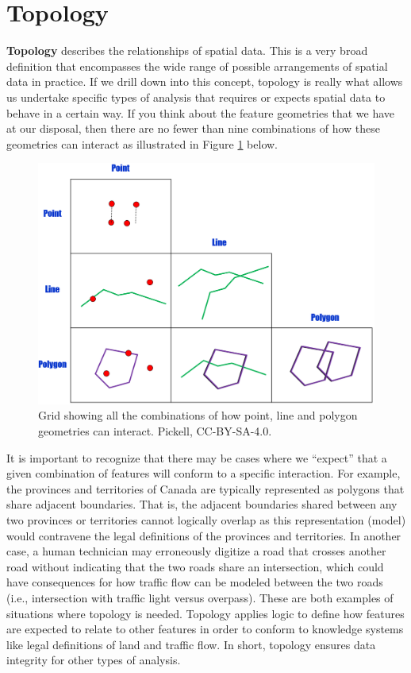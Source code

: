 \documentclass[
]{book}
\begin{document}
\hypertarget{topology}{%
\section{Topology}\label{topology}}

\textbf{Topology} describes the relationships of spatial data. This is a very broad definition that encompasses the wide range of possible arrangements of spatial data in practice. If we drill down into this concept, topology is really what allows us undertake specific types of analysis that requires or expects spatial data to behave in a certain way. If you think about the feature geometries that we have at our disposal, then there are no fewer than nine combinations of how these geometries can interact as illustrated in Figure \ref{fig:7-topology-grid} below.

\begin{figure}
\includegraphics[width=0.75\linewidth]{images/07-topology-grid} \caption{Grid showing all the combinations of how point, line and polygon geometries can interact. Pickell, CC-BY-SA-4.0.}\label{fig:7-topology-grid}
\end{figure}

It is important to recognize that there may be cases where we ``expect'' that a given combination of features will conform to a specific interaction. For example, the provinces and territories of Canada are typically represented as polygons that share adjacent boundaries. That is, the adjacent boundaries shared between any two provinces or territories cannot logically overlap as this representation (model) would contravene the legal definitions of the provinces and territories. In another case, a human technician may erroneously digitize a road that crosses another road without indicating that the two roads share an intersection, which could have consequences for how traffic flow can be modeled between the two roads (i.e., intersection with traffic light versus overpass). These are both examples of situations where topology is needed. Topology applies logic to define how features are expected to relate to other features in order to conform to knowledge systems like legal definitions of land and traffic flow. In short, topology ensures data integrity for other types of analysis.
\end{document}
